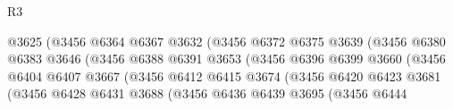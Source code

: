 \begin{lexlean}{R3}
\begin{coremodule}
                                            @3625
                                            (@3456
                                              @6364
                                              @6367
                                              @3632
                                              (@3456
                                                @6372
                                                @6375
                                                @3639
                                                (@3456
                                                  @6380
                                                  @6383
                                                  @3646
                                                  (@3456
                                                    @6388
                                                    @6391
                                                    @3653
                                                    (@3456
                                                      @6396
                                                      @6399
                                                      @3660
                                                      (@3456
                                                        @6404
                                                        @6407
                                                        @3667
                                                        (@3456
                                                          @6412
                                                          @6415
                                                          @3674
                                                          (@3456
                                                            @6420
                                                            @6423
                                                            @3681
                                                            (@3456
                                                              @6428
                                                              @6431
                                                              @3688
                                                              (@3456
                                                                @6436
                                                                @6439
                                                                @3695
                                                                (@3456
                                                                  @6444

\end{coremodule}
\end{lexlean}
